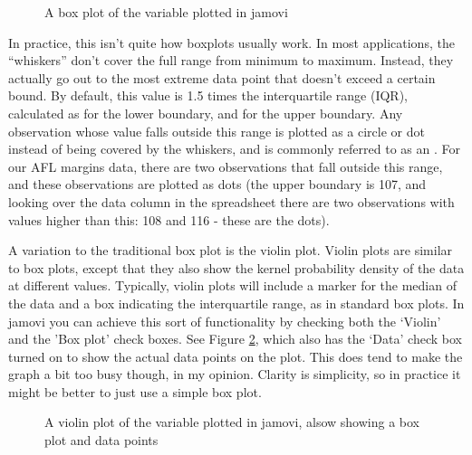 \begin{figure}[ht]
\begin{center}
\caption{A box plot of the  variable plotted in jamovi}
\label{fig:boxplot1}
\HR
\end{center}
\end{figure}

In practice, this isn't quite how boxplots usually work. In most applications, the ``whiskers'' don't cover the full range from minimum to maximum. Instead, they actually go out to the most extreme data point that doesn't exceed a certain bound. By default, this value is 1.5 times the interquartile range (IQR), calculated as  for the lower boundary, and  for the upper boundary. Any observation whose value falls outside this range is plotted as a circle or dot instead of being covered by the whiskers, and is commonly referred to as an . For our AFL margins data, there are two observations that fall outside this range, and these observations are plotted as dots (the upper boundary is 107, and looking over the data column in the spreadsheet there are two observations with values higher than this: 108 and 116 - these are the dots). 



A variation to the traditional box plot is the violin plot. Violin plots are similar to box plots, except that they also show the kernel probability density of the data at different values. Typically, violin plots will include a marker for the median of the data and a box indicating the interquartile range, as in standard box plots. In jamovi you can achieve this sort of functionality by checking both the `Violin' and the 'Box plot' check boxes. See Figure \ref{fig:boxplot2}, which also has the `Data' check box turned on to show the actual data points on the plot. This does tend to make the graph a bit too busy though, in my opinion. Clarity is simplicity, so in practice it might be better to just use a simple box plot.


\begin{figure}[ht]
\begin{center}
\caption{A violin plot of the  variable plotted in jamovi, alsow showing a box plot and data points}
\label{fig:boxplot2}
\HR
\end{center}
\end{figure}



